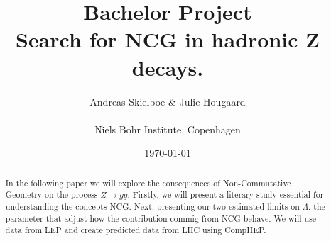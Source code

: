 \documentclass[11pt,a4paper,titlepage]{article}
\numberwithin{equation}{section}
\begin{document}
\title{Bachelor Project\\Search for NCG in hadronic Z decays.}
\author{Andreas Skielboe \& Julie Hougaard \\ \\ Niels Bohr Institute, Copenhagen}
\date{\today}
\maketitle
{}

\begin{abstract}
In the following paper we will explore the consequences of Non-Commutative Geometry on the process $Z \rightarrow gg$. Firstly, we will present a literary study essential for understanding the concepts NCG. Next, presenting our two estimated limits on $\Lambda$, the parameter that adjust how the contribution commig from NCG behave. We will use data from LEP and create predicted data from LHC using CompHEP.
\end{abstract}

\clearpage
\tableofcontents
\clearpage





\clearpage












\clearpage


\clearpage



\end{document}
